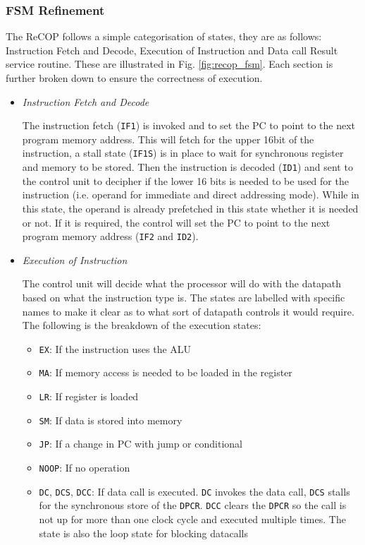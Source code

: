 \documentclass[]{article}
\begin{document}
	
	
	\subsubsection{FSM Refinement}
	
	
	The ReCOP follows a simple categorisation of states, they are as follows: Instruction Fetch and Decode, Execution of Instruction and Data call Result service routine. These are illustrated in Fig. \ref{fig:recop_fsm}. Each section is further broken down to ensure the correctness of execution.
	\begin{itemize}
		\item \emph{Instruction Fetch and Decode} \par
		The instruction fetch (\texttt{IF1}) is invoked and to set the PC to point to the next program memory address. This will fetch for the upper 16bit of the instruction, a stall state (\texttt{IF1S}) is in place to wait for synchronous register and memory to be stored. Then the instruction is decoded (\texttt{ID1}) and sent to the control unit to decipher if the lower 16 bits is needed to be used for the instruction (i.e. operand for immediate and direct addressing mode). While in this state, the operand is already prefetched in this state whether it is needed or not. If it is required, the control will set the PC to point to the next program memory address (\texttt{IF2} and \texttt{ID2}).
		
		\item \emph{Execution of Instruction} \par 
		The control unit will decide what the processor will do with the datapath based on what the instruction type is. The states are labelled with specific names to make it clear as to what sort of datapath controls it would require. The following is the breakdown of the execution states:
		\begin{itemize}
			\item \texttt{EX}: If the instruction uses the ALU
			\item \texttt{MA}: If memory access is needed to be loaded in the register
			\item \texttt{LR}: If register is loaded
			\item \texttt{SM}: If data is stored into memory
			\item \texttt{JP}: If a change in PC with jump or conditional
			\item \texttt{NOOP}: If no operation
			\item \texttt{DC}, \texttt{DCS}, \texttt{DCC}: If data call is executed. \texttt{DC} invokes the data call, \texttt{DCS} stalls for the synchronous store of the \texttt{DPCR}. \texttt{DCC} clears the \texttt{DPCR} so the call is not up for more than one clock cycle and executed multiple times. The state is also the loop state for blocking datacalls
		\end{itemize}
		

\end{itemize}
\end{document}

